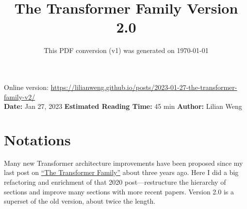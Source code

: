 \documentclass[12pt]{article}
\title{The Transformer Family Version 2.0}
\date{This PDF conversion (v1) was generated on \today\footnotemark}
\begin{document}
\maketitle
\begin{center}
    Online version: \url{https://lilianweng.github.io/posts/2023-01-27-the-transformer-family-v2/} \\
    \textbf{Date:} Jan 27, 2023 \quad
    \textbf{Estimated Reading Time:} 45 min \quad
    \textbf{Author:} Lilian Weng
\end{center}


\newpage
\tableofcontents
\newpage
\vspace{1em}

\section{Notations}
Many new Transformer architecture improvements have been proposed since my last post on \href{https://lilianweng.github.io/posts/2020-04-07-the-transformer-family/}{``The Transformer Family''} about three years ago. Here I did a big refactoring and enrichment of that 2020 post---restructure the hierarchy of sections and improve many sections with more recent papers. Version 2.0 is a superset of the old version, about twice the length.
\end{document}
